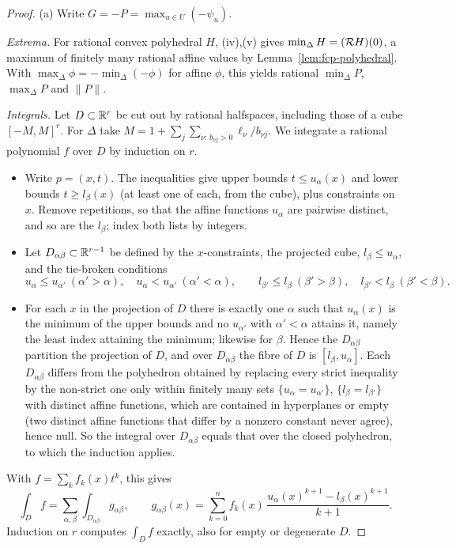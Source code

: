 \begin{proof}
(a) Write $G=-P=\max_{u\in U}(-\psi_u)$.

\emph{Extrema.} For rational convex polyhedral $H$, (iv),(v) gives $\min_\Delta H=(\mathcal{R} H)(0)$, a maximum of finitely many rational affine values by Lemma~\ref{lem:fcp-polyhedral}. With $\max_\Delta\phi=-\min_\Delta(-\phi)$ for affine $\phi$, this yields rational $\min_\Delta P$, $\max_\Delta P$ and $\|P\|$.

\emph{Integrals.} Let $D\subset\mathbb{R}^r$ be cut out by rational halfspaces, including those of a cube $[-M,M]^r$. For $\Delta$ take $M=1+\sum_j\sum_{\nu:\,b_{\nu j}>0}\ell_\nu/b_{\nu j}$. We integrate a rational polynomial $f$ over $D$ by induction on $r$.
\begin{itemize}
\item Write $p=(x,t)$. The inequalities give upper bounds $t\le u_\alpha(x)$ and lower bounds $t\ge l_\beta(x)$ (at least one of each, from the cube), plus constraints on $x$. Remove repetitions, so that the affine functions $u_\alpha$ are pairwise distinct, and so are the $l_\beta$; index both lists by integers.
\item Let $D_{\alpha\beta}\subset\mathbb{R}^{r-1}$ be defined by the $x$-constraints, the projected cube, $l_\beta\le u_\alpha$, and the tie-broken conditions
 \[
  u_\alpha\le u_{\alpha'}\ (\alpha'>\alpha),\quad u_\alpha<u_{\alpha'}\ (\alpha'<\alpha),\qquad
  l_{\beta'}\le l_\beta\ (\beta'>\beta),\quad l_{\beta'}<l_\beta\ (\beta'<\beta).
 \]
\item For each $x$ in the projection of $D$ there is exactly one $\alpha$ such that $u_\alpha(x)$ is the minimum of the upper bounds and no $u_{\alpha'}$ with $\alpha'<\alpha$ attains it, namely the least index attaining the minimum; likewise for $\beta$. Hence the $D_{\alpha\beta}$ partition the projection of $D$, and over $D_{\alpha\beta}$ the fibre of $D$ is $[l_\beta,u_\alpha]$. Each $D_{\alpha\beta}$ differs from the polyhedron obtained by replacing every strict inequality by the non-strict one only within finitely many sets $\{u_\alpha=u_{\alpha'}\}$, $\{l_\beta=l_{\beta'}\}$ with distinct affine functions, which are contained in hyperplanes or empty (two distinct affine functions that differ by a nonzero constant never agree), hence null. So the integral over $D_{\alpha\beta}$ equals that over the closed polyhedron, to which the induction applies.
\end{itemize}

With $f=\sum_kf_k(x)t^k$, this gives
\[
 \int_Df=\sum_{\alpha,\beta}\int_{D_{\alpha\beta}}g_{\alpha\beta},\qquad
 g_{\alpha\beta}(x)=\sum_{k=0}^nf_k(x)\,\frac{u_\alpha(x)^{k+1}-l_\beta(x)^{k+1}}{k+1}.
\]
Induction on $r$ computes $\int_Df$ exactly, also for empty or degenerate $D$.


\end{proof}
